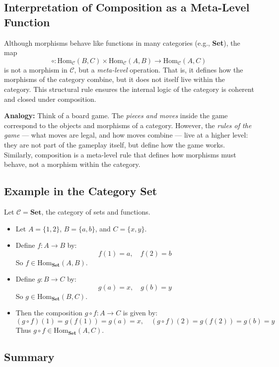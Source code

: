 \documentclass[10pt]{article}
\theoremstyle{plain}
\theoremstyle{definition}
\begin{document}
\subsection*{Interpretation of Composition as a Meta-Level Function}

Although morphisms behave like functions in many categories (e.g., \textbf{Set}), the map
\[
\circ : \text{Hom}_\mathcal{C}(B, C) \times \text{Hom}_\mathcal{C}(A, B) \to \text{Hom}_\mathcal{C}(A, C)
\]
is not a morphism in \( \mathcal{C} \), but a \textit{meta-level} operation. That is, it defines how the morphisms of the category combine, but it does not itself live within the category. This structural rule ensures the internal logic of the category is coherent and closed under composition.

\textbf{Analogy:} Think of a board game. The \emph{pieces and moves} inside the game correspond to the objects and morphisms of a category. However, the \emph{rules of the game} — what moves are legal, and how moves combine — live at a higher level: they are not part of the gameplay itself, but define how the game works. Similarly, composition is a meta-level rule that defines how morphisms must behave, not a morphism within the category.

\subsection*{Example in the Category \textbf{Set}}

Let \( \mathcal{C} = \textbf{Set} \), the category of sets and functions.

\begin{itemize}
	\item Let \( A = \{1,2\} \), \( B = \{a,b\} \), and \( C = \{x,y\} \).
	\item Define \( f : A \to B \) by:
	\[
	f(1) = a,\quad f(2) = b
	\]
	So \( f \in \text{Hom}_\textbf{Set}(A, B) \).
	\item Define \( g : B \to C \) by:
	\[
	g(a) = x,\quad g(b) = y
	\]
	So \( g \in \text{Hom}_\textbf{Set}(B, C) \).
	\item Then the composition \( g \circ f : A \to C \) is given by:
	\[
	(g \circ f)(1) = g(f(1)) = g(a) = x,\quad (g \circ f)(2) = g(f(2)) = g(b) = y
	\]
	Thus \( g \circ f \in \text{Hom}_\textbf{Set}(A, C) \).
\end{itemize}

\subsection*{Summary}
\end{document}
